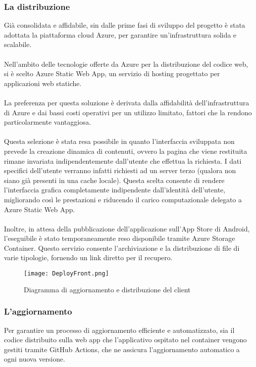 \clearpage


\subsubsection{La distribuzione}

Già consolidata e affidabile, sin dalle prime fasi di sviluppo del progetto è stata adottata la piattaforma cloud Azure, per garantire un'infrastruttura solida e scalabile.\\
\\
Nell'ambito delle tecnologie offerte da Azure per la  distribuzione del codice web, si è scelto Azure Static Web App, un servizio di hosting progettato per applicazioni web statiche. \\
\\
La preferenza per questa soluzione è derivata dalla affidabilità dell'infrastruttura di Azure e dai bassi costi operativi per un utilizzo limitato,
fattori che la rendono particolarmente vantaggiosa.\\
\\
Questa selezione è stata resa possibile in quanto l’interfaccia sviluppata non prevede la creazione dinamica di contenuti,
ovvero la pagina che viene restituita rimane invariata indipendentemente dall’utente che effettua la richiesta.
I dati specifici dell’utente verranno infatti richiesti ad un server terzo (qualora non siano già presenti in una cache locale).
Questa scelta consente di rendere l’interfaccia grafica completamente indipendente dall’identità dell’utente,
migliorando così le prestazioni e riducendo il carico computazionale delegato a Azure Static Web App.\\
\\
Inoltre, in attesa della pubblicazione dell’applicazione sull’App Store di Android, l’eseguibile è stato temporaneamente reso disponibile tramite Azure Storage Container.
Questo servizio consente l’archiviazione e la distribuzione di file di varie tipologie, fornendo un link diretto per il recupero.\\


\clearpage
\begin{figure}[h!]
    \begin{center}
        \texttt{[image: DeployFront.png]}
        \caption{Diagramma di aggiornamento e distribuzione del client}
    \end{center}
\end{figure}

\subsubsection{L'aggiornamento}
Per garantire un processo di aggiornamento efficiente e automatizzato,
sia il codice distribuito sulla web app che l’applicativo ospitato nel container vengono gestiti tramite GitHub Actions,
che ne assicura l’aggiornamento automatico a ogni nuova versione. \\
\\

